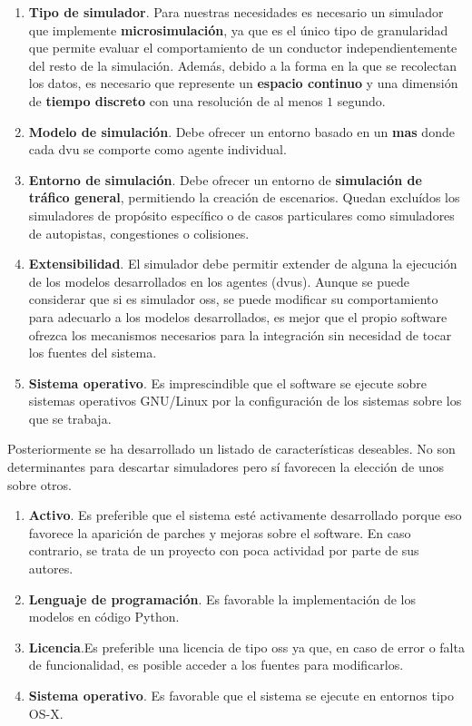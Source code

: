 \begin{enumerate}
	\item \textbf{Tipo de simulador}. Para nuestras necesidades es necesario un simulador que implemente \textbf{microsimulación}, ya que es el único tipo de granularidad que permite evaluar el comportamiento de un conductor independientemente del resto de la simulación. Además, debido a la forma en la que se recolectan los datos, es necesario que represente un \textbf{espacio continuo} y una dimensión de \textbf{tiempo discreto} con una resolución de al menos $1$ segundo.
	\item \textbf{Modelo de simulación}. Debe ofrecer un entorno basado en un \textbf{\gls{mas}} donde cada \gls{dvu} se comporte como agente individual.
	\item \textbf{Entorno de simulación}. Debe ofrecer un entorno de \textbf{simulación de tráfico general}, permitiendo la creación de escenarios. Quedan excluídos los simuladores de propósito específico o de casos particulares como simuladores de autopistas, congestiones o colisiones.
	\item \textbf{Extensibilidad}. El simulador debe permitir extender de alguna la ejecución de los modelos desarrollados en los agentes (\glspl{dvu}). Aunque se puede considerar que si es simulador \gls{oss}, se puede modificar su comportamiento para adecuarlo a los modelos desarrollados, es mejor que el propio software ofrezca los mecanismos necesarios para la integración sin necesidad de tocar los fuentes del sistema.
	\item \textbf{Sistema operativo}. Es imprescindible que el software se ejecute sobre sistemas operativos GNU/Linux por la configuración de los sistemas sobre los que se trabaja.
\end{enumerate}

Posteriormente se ha desarrollado un listado de características deseables. No son determinantes para descartar simuladores pero sí favorecen la elección de unos sobre otros.

\begin{enumerate}
	\item \textbf{Activo}. Es preferible que el sistema esté activamente desarrollado porque eso favorece la aparición de parches y mejoras sobre el software. En caso contrario, se trata de un proyecto con poca actividad por parte de sus autores.
	\item \textbf{Lenguaje de programación}. Es favorable la implementación de los modelos en código Python.
	\item \textbf{Licencia}.Es preferible una licencia de tipo \Ac{oss} ya que, en caso de error o falta de funcionalidad, es posible acceder a los fuentes para modificarlos.
	\item \textbf{Sistema operativo}. Es favorable que el sistema se ejecute en entornos tipo OS-X.
\end{enumerate}

